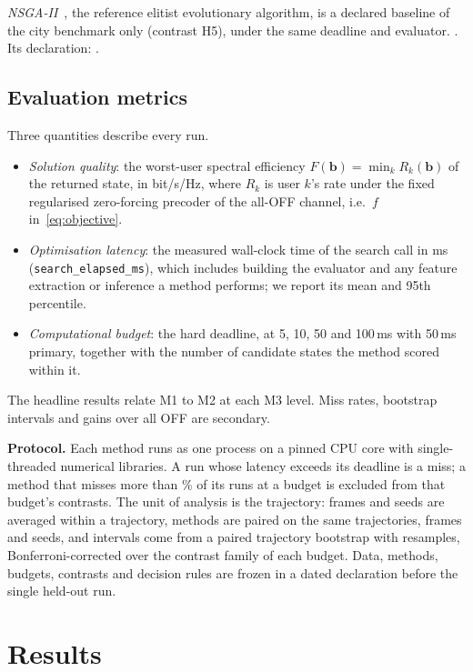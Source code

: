 \documentclass[runningheads]{llncs}
\begin{document}
\emph{NSGA-II}~\cite{deb2002fast}, the reference elitist evolutionary algorithm, is a declared baseline of the city benchmark only (contrast H5), under the same deadline and evaluator. . Its declaration: .

\subsection{Evaluation metrics}\label{sec:metrics}
Three quantities describe every run.
\begin{itemize}
\item[\textbf{M1}] \emph{Solution quality}: the worst-user spectral efficiency $F(\mathbf b)=\min_k R_k(\mathbf b)$ of the returned state, in bit/s/Hz, where $R_k$ is user $k$'s rate under the fixed regularised zero-forcing precoder of the all-OFF channel, i.e.\ $f$ in~\eqref{eq:objective}.
\item[\textbf{M2}] \emph{Optimisation latency}: the measured wall-clock time of the search call in ms (\texttt{search\_elapsed\_ms}), which includes building the evaluator and any feature extraction or inference a method performs; we report its mean and 95th percentile.
\item[\textbf{M3}] \emph{Computational budget}: the hard deadline, at 5, 10, 50 and 100\,ms with 50\,ms primary, together with the number of candidate states the method scored within it.
\end{itemize}
The headline results relate M1 to M2 at each M3 level. Miss rates, bootstrap intervals and gains over all OFF are secondary.

\textbf{Protocol.} Each method runs as one process on a pinned CPU core with single-threaded numerical libraries. A run whose latency exceeds its deadline is a miss; a method that misses more than \% of its runs at a budget is excluded from that budget's contrasts. The unit of analysis is the trajectory: frames and  seeds are averaged within a trajectory, methods are paired on the same trajectories, frames and seeds, and intervals come from a paired trajectory bootstrap with  resamples, Bonferroni-corrected over the contrast family of each budget. Data, methods, budgets, contrasts and decision rules are frozen in a dated declaration before the single held-out run.

\section{Results}\label{sec:results}
\end{document}
